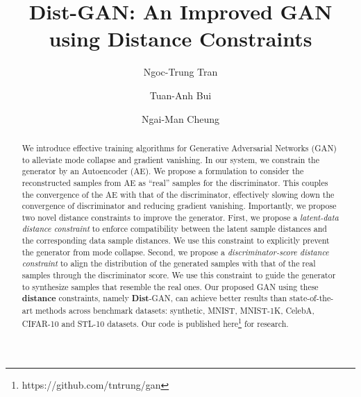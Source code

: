 \documentclass[runningheads]{llncs}
\begin{document}
\title{Dist-GAN: An Improved GAN using Distance Constraints} 


\author{Ngoc-Trung Tran  \and
Tuan-Anh Bui  \and
Ngai-Man Cheung }


\maketitle              

\begin{abstract}









We introduce effective training algorithms for  Generative Adversarial Networks (GAN)  to alleviate mode collapse and gradient vanishing. In our system,  we constrain the generator by an  Autoencoder (AE). We propose a formulation to consider the reconstructed samples from AE as ``real'' samples for the discriminator. This couples the convergence of the AE with that of the discriminator, effectively slowing down the convergence of discriminator and reducing gradient vanishing.
Importantly, we propose two novel distance constraints to improve the generator. First, we propose a {\em latent-data distance constraint} to enforce compatibility between the latent sample distances and the corresponding data sample distances. We use this constraint to explicitly prevent the generator from mode collapse. Second, we propose a {\em discriminator-score distance constraint} to align the distribution of the generated samples with that of the real samples through the discriminator score. We use this constraint to guide the generator to synthesize samples that resemble the real ones. Our proposed GAN using these {\bf distance} constraints, namely {\bf Dist}-GAN, can achieve better results than state-of-the-art methods across benchmark datasets: synthetic, MNIST, MNIST-1K, CelebA, CIFAR-10 and STL-10 datasets. Our code is published here\footnote{https://github.com/tntrung/gan} for research.


\end{abstract} 
\end{document}
